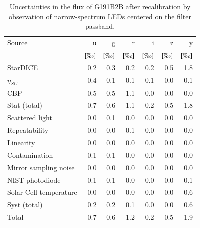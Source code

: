 \begin{table}
  \centering
  \caption{Uncertainties in the flux of G191B2B after recalibration by observation of narrow-spectrum LEDs centered on the filter passband.}
  \label{tab:led}
  \begin{tabular}{lrrrrrr}
    \toprule
    Source & u & g & r & i & z & y \\
           & $[\text{\textperthousand}]$ & $[\text{\textperthousand}]$ & $[\text{\textperthousand}]$ & $[\text{\textperthousand}]$ & $[\text{\textperthousand}]$ & $[\text{\textperthousand}]$\\
    \midrule
    StarDICE & 0.2 & 0.3 & 0.2 & 0.2 & 0.5 & 1.8 \\
    $\eta_{SC}$ & 0.4 & 0.1 & 0.1 & 0.1 & 0.0 & 0.1 \\
    CBP & 0.5 & 0.5 & 1.1 & 0.0 & 0.0 & 0.0 \\
    \midrule
    Stat (total) & 0.7 & 0.6 & 1.1 & 0.2 & 0.5 & 1.8 \\
    \midrule
    Scattered light & 0.0 & 0.1 & 0.0 & 0.0 & 0.0 & 0.0 \\
    Repeatability & 0.0 & 0.0 & 0.1 & 0.0 & 0.0 & 0.0 \\
    Linearity & 0.0 & 0.0 & 0.0 & 0.0 & 0.0 & 0.0 \\
    Contamination & 0.1 & 0.1 & 0.0 & 0.0 & 0.0 & 0.0 \\
    Mirror sampling noise & 0.0 & 0.0 & 0.0 & 0.0 & 0.0 & 0.0 \\
    NIST photodiode & 0.1 & 0.1 & 0.0 & 0.0 & 0.0 & 0.1 \\
    Solar Cell temperature & 0.0 & 0.0 & 0.0 & 0.0 & 0.0 & 0.6 \\
    \midrule
    Syst (total) & 0.2 & 0.2 & 0.1 & 0.0 & 0.0 & 0.6 \\
    \midrule
    Total & 0.7 & 0.6 & 1.2 & 0.2 & 0.5 & 1.9 \\
    \bottomrule
  \end{tabular}
  
  
\end{table}


